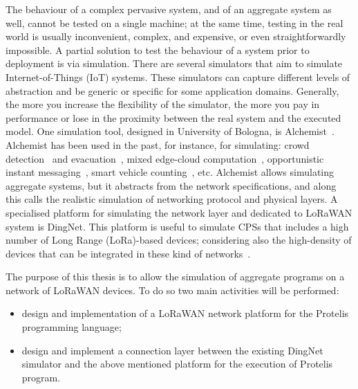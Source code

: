 The behaviour of a complex pervasive system, and of an aggregate system as well, cannot be tested on a single machine; at the same time, testing in the real world is usually inconvenient, complex, and expensive, or even straightforwardly impossible.
A partial solution to test the behaviour of a system prior to deployment is via simulation.
There are several simulators that aim to simulate Internet-of-Things (IoT) systems.
These simulators can capture different levels of abstraction and be generic or specific for some application domains.
Generally, the more you increase the flexibility of the simulator, the more you pay in performance or lose in the proximity between the real system and the executed model.
One simulation tool, designed in University of Bologna, is Alchemist~\cite{PianiniJOS2013}.
Alchemist has been used in the past, for instance, for simulating: crowd detection~\cite{FGCS2017, TOMACS2018} and evacuation~\cite{DBLP:journals/corr/abs-1711-08297}, mixed edge-cloud computation~\cite{Coordination2019-sgcg}, opportunistic instant messaging~\cite{Coordination2019-processes}, smart vehicle counting~\cite{Viroli2016}, etc.
Alchemist allows simulating aggregate systems, but it abstracts from the network specifications, and along this calls the realistic simulation of networking protocol and physical layers.
A specialised platform for simulating the network layer and dedicated to LoRaWAN system is DingNet. %
This platform is useful to simulate CPSs that includes a high number of Long Range (LoRa)-based devices; considering also the high-density of devices that can be integrated in these kind of networks~\cite{Lavric2019}. 

The purpose of this thesis is to allow the simulation of aggregate programs on a network of LoRaWAN devices.
To do so two main activities will be performed: 
\begin{itemize}
    \item design and implementation of a LoRaWAN network platform for the Protelis~\cite{PianiniSAC2015} programming language;
    \item design and implement a connection layer between the existing DingNet simulator and the above mentioned platform for the execution of Protelis program.
\end{itemize}

